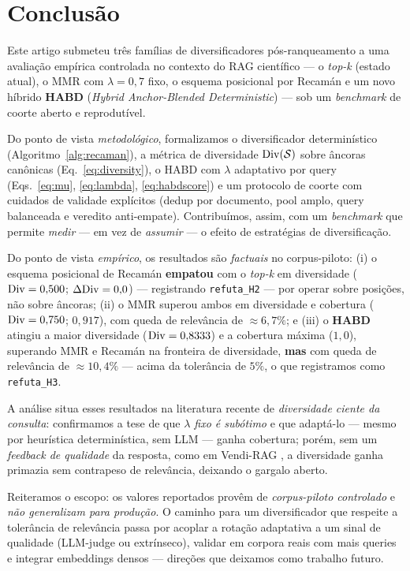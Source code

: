 \section{Conclusão}
\label{sec:conclusao}

Este artigo submeteu três famílias de diversificadores pós-ranqueamento a uma
avaliação empírica controlada no contexto do RAG científico — o \emph{top-k}
(estado atual), o MMR com $\lambda=0{,}7$ fixo, o esquema posicional por Recamán e
um novo híbrido \textbf{HABD} (\emph{Hybrid Anchor-Blended Deterministic}) — sob
um \emph{benchmark} de coorte aberto e reprodutível.

Do ponto de vista \emph{metodológico}, formalizamos o diversificador
determinístico (Algoritmo~\ref{alg:recaman}), a métrica de diversidade
$\mathrm{Div}(\mathcal{S})$ sobre âncoras canônicas (Eq.~\ref{eq:diversity}), o HABD com
$\lambda$ adaptativo por query (Eqs.~\ref{eq:mu}, \ref{eq:lambda},
\ref{eq:habdscore}) e um protocolo de coorte com cuidados de validade explícitos
(dedup por documento, pool amplo, query balanceada e veredito anti-empate).
Contribuímos, assim, com um \emph{benchmark} que permite \emph{medir} — em vez de
\emph{assumir} — o efeito de estratégias de diversificação.

Do ponto de vista \emph{empírico}, os resultados são \emph{factuais} no
corpus-piloto: (i) o esquema posicional de Recamán \textbf{empatou} com o
\emph{top-k} em diversidade ($\mathrm{Div}=0{,}500$; $\Delta\mathrm{Div}=0{,}0$) — registrando
\texttt{refuta\_H2} — por operar sobre posições, não sobre âncoras; (ii) o MMR
superou ambos em diversidade e cobertura ($\mathrm{Div}=0{,}750$; $0{,}917$), com queda de
relevância de $\approx 6{,}7\%$; e (iii) o \textbf{HABD} atingiu a maior
diversidade ($\mathrm{Div}=0{,}8333$) e a cobertura máxima ($1{,}0$), superando MMR e
Recamán na fronteira de diversidade, \textbf{mas} com queda de relevância de
$\approx 10{,}4\%$ — acima da tolerância de $5\%$, o que registramos como
\texttt{refuta\_H3}.

A análise situa esses resultados na literatura recente de \emph{diversidade ciente
da consulta}: confirmamos a tese de que \emph{$\lambda$ fixo é subótimo}
\citep{Khan2026DFRAG} e que adaptá-lo — mesmo por heurística determinística, sem
LLM — ganha cobertura; porém, sem um \emph{feedback de qualidade} da resposta,
como em Vendi-RAG \citep{RezaeiDieng2025VendiRAG}, a diversidade ganha primazia
sem contrapeso de relevância, deixando o gargalo aberto.

Reiteramos o escopo: os valores reportados provêm de \emph{corpus-piloto
controlado} e \emph{não generalizam para produção}. O caminho para um diversificador
que respeite a tolerância de relevância passa por acoplar a rotação adaptativa a um
sinal de qualidade (LLM-judge ou extrínseco), validar em corpora reais com mais
queries e integrar embeddings densos — direções que deixamos como trabalho futuro.
